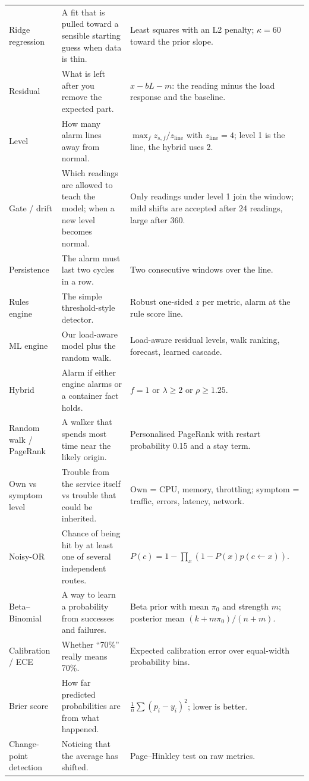 \begin{longtable}{>{\raggedright\arraybackslash}p{3.1cm}>{\raggedright\arraybackslash}p{5.5cm}>{\raggedright\arraybackslash}p{5.6cm}}
Ridge regression & A fit that is pulled toward a sensible starting guess when data is thin. & Least squares with an L2 penalty; $\kappa=60$ toward the prior slope.\\
Residual & What is left after you remove the expected part. & $x-bL-m$: the reading minus the load response and the baseline.\\
Level & How many alarm lines away from normal. & $\max_f z_{s,f}/z_{\text{line}}$ with $z_{\text{line}}=4$; level 1 is the line, the hybrid uses 2.\\
Gate / drift & Which readings are allowed to teach the model; when a new level becomes normal. & Only readings under level 1 join the window; mild shifts are accepted after 24 readings, large after 360.\\
Persistence & The alarm must last two cycles in a row. & Two consecutive windows over the line.\\
Rules engine & The simple threshold-style detector. & Robust one-sided $z$ per metric, alarm at the rule score line.\\
ML engine & Our load-aware model plus the random walk. & Load-aware residual levels, walk ranking, forecast, learned cascade.\\
Hybrid & Alarm if either engine alarms or a container fact holds. & $f=1$ or $\lambda\ge2$ or $\rho\ge1.25$.\\
Random walk / PageRank & A walker that spends most time near the likely origin. & Personalised PageRank with restart probability 0.15 and a stay term.\\
Own vs symptom level & Trouble from the service itself vs trouble that could be inherited. & Own = CPU, memory, throttling; symptom = traffic, errors, latency, network.\\
Noisy-OR & Chance of being hit by at least one of several independent routes. & $P(c)=1-\prod_x(1-P(x)\hat p(c\leftarrow x))$.\\
Beta--Binomial & A way to learn a probability from successes and failures. & Beta prior with mean $\pi_0$ and strength $m$; posterior mean $(k+m\pi_0)/(n+m)$.\\
Calibration / ECE & Whether ``70\%'' really means 70\%. & Expected calibration error over equal-width probability bins.\\
Brier score & How far predicted probabilities are from what happened. & $\frac1n\sum(p_i-y_i)^2$; lower is better.\\
Change-point detection & Noticing that the average has shifted. & Page--Hinkley test on raw metrics.\\

\end{longtable}
